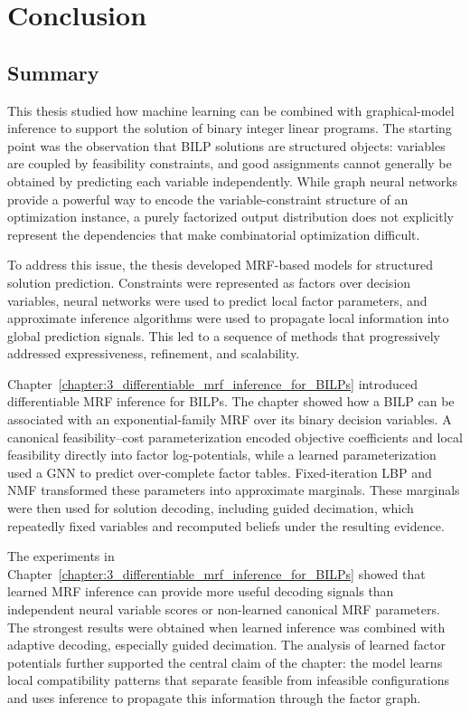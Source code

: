 \chapter{Conclusion}\label{chap6:conclusion}

\section{Summary}

This thesis studied how machine learning can be combined with graphical-model inference to support the solution of binary integer linear programs. The starting point was the observation that BILP solutions are structured objects: variables are coupled by feasibility constraints, and good assignments cannot generally be obtained by predicting each variable independently. While graph neural networks provide a powerful way to encode the variable-constraint structure of an optimization instance, a purely factorized output distribution does not explicitly represent the dependencies that make combinatorial optimization difficult.

To address this issue, the thesis developed MRF-based models for structured solution prediction. Constraints were represented as factors over decision variables, neural networks were used to predict local factor parameters, and approximate inference algorithms were used to propagate local information into global prediction signals. This led to a sequence of methods that progressively addressed expressiveness, refinement, and scalability.

Chapter~\ref{chapter:3_differentiable_mrf_inference_for_BILPs} introduced differentiable MRF inference for BILPs. The chapter showed how a BILP can be associated with an exponential-family MRF over its binary decision variables. A canonical feasibility--cost parameterization encoded objective coefficients and local feasibility directly into factor log-potentials, while a learned parameterization used a GNN to predict over-complete factor tables. Fixed-iteration LBP and NMF transformed these parameters into approximate marginals. These marginals were then used for solution decoding, including guided decimation, which repeatedly fixed variables and recomputed beliefs under the resulting evidence.

The experiments in Chapter~\ref{chapter:3_differentiable_mrf_inference_for_BILPs} showed that learned MRF inference can provide more useful decoding signals than independent neural variable scores or non-learned canonical MRF parameters. The strongest results were obtained when learned inference was combined with adaptive decoding, especially guided decimation. The analysis of learned factor potentials further supported the central claim of the chapter: the model learns local compatibility patterns that separate feasible from infeasible configurations and uses inference to propagate this information through the factor graph.

